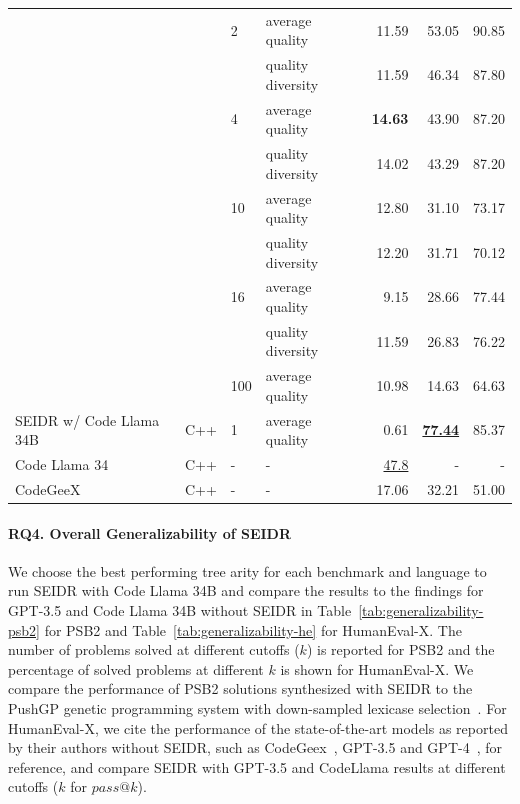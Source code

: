 \begin{table}[htb]
\begin{adjustbox}{max width=\textwidth}
\begin{tabular}{llllrrr}
&        & 2   & average quality &   11.59 &    53.05 &     90.85 \\
&        &     & quality diversity  &   11.59 &    46.34 &     87.80 \\
&        & 4   & average quality &   \textbf{14.63} &    43.90 &     87.20 \\
&        &     & quality diversity  &   14.02 &    43.29 &     87.20 \\
&        & 10  & average quality &   12.80 &    31.10 &     73.17 \\
&        &     & quality diversity  &   12.20 &    31.71 &     70.12 \\
&        & 16  & average quality &    9.15 &    28.66 &     77.44 \\
&        &     & quality diversity  &   11.59 &    26.83 &     76.22 \\
&        & 100 & average quality &   10.98 &    14.63 &     64.63 \\
\midrule
SEIDR w/ Code Llama 34B & C++ & 1 & average quality &    0.61 &    \underline{\textbf{77.44}} &     85.37 \\
\midrule
Code Llama 34 & C++ & - &  - &  \underline{47.8}  &  -   &    - \\
CodeGeeX & C++ & - &  - &  17.06  &  32.21   &    51.00 \\
\bottomrule
\end{tabular}
\end{adjustbox}

\end{table}


\paragraph{RQ4. Overall Generalizability of SEIDR}
\label{sec:seidr-results-rq3}

We choose the best performing tree arity for each benchmark and language to run SEIDR with Code Llama 34B and compare the results to the findings for GPT-3.5 and Code Llama 34B without SEIDR in Table~\ref{tab:generalizability-psb2} for PSB2 and Table~\ref{tab:generalizability-he} for HumanEval-X. 
The number of problems solved at different cutoffs ($k$) is reported for PSB2 and the percentage of solved problems at different $k$ is shown for HumanEval-X.
We compare the performance of PSB2 solutions synthesized with SEIDR to the PushGP genetic programming system with down-sampled lexicase selection~\cite{helmuth2022:problemsolving}. 
For HumanEval-X, we cite the performance of the state-of-the-art models as reported by their authors without SEIDR, such as CodeGeex~\cite{zheng2023:codegeex}, GPT-3.5 and GPT-4~\cite{openai2023:gpt4}, for reference, and compare SEIDR with GPT-3.5 and CodeLlama results at different cutoffs ($k$ for $pass@k$).

